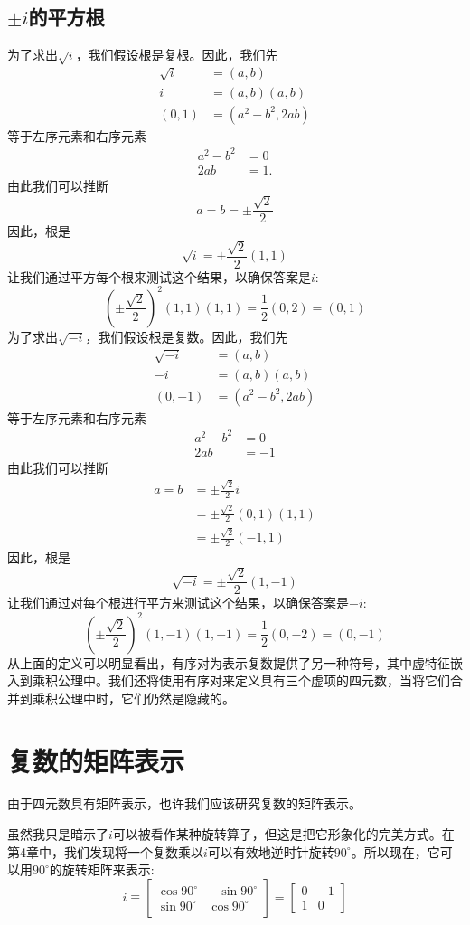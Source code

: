 \subsection{\boldmath $\pm i$的平方根}
为了求出$\sqrt{i}$，我们假设根是复根。因此，我们先
$$
\begin{aligned}
\sqrt{i} & =(a, b) \\
i & =(a, b)(a, b) \\
(0,1) & =\left(a^{2}-b^{2}, 2 a b\right)
\end{aligned}
$$
等于左序元素和右序元素
$$
\begin{aligned}
a^{2}-b^{2} & =0 \\
2 a b & =1 .
\end{aligned}
$$
由此我们可以推断
$$
a=b= \pm \frac{\sqrt{2}}{2}
$$
因此，根是
$$
\sqrt{i}= \pm \frac{\sqrt{2}}{2}(1,1)
$$
让我们通过平方每个根来测试这个结果，以确保答案是$i$:
$$
\left( \pm \frac{\sqrt{2}}{2}\right)^{2}(1,1)(1,1)=\frac{1}{2}(0,2)=(0,1)
$$
为了求出$\sqrt{-i}$，我们假设根是复数。因此，我们先
$$
\begin{aligned}
\sqrt{-i} & =(a, b) \\
-i & =(a, b)(a, b) \\
(0,-1) & =\left(a^{2}-b^{2}, 2 a b\right)
\end{aligned}
$$
等于左序元素和右序元素
$$
\begin{aligned}
a^{2}-b^{2} & =0 \\
2 a b & =-1
\end{aligned}
$$
由此我们可以推断
$$
\begin{aligned}
a=b & = \pm \frac{\sqrt{2}}{2} i \\
& = \pm \frac{\sqrt{2}}{2}(0,1)(1,1) \\
& = \pm \frac{\sqrt{2}}{2}(-1,1)
\end{aligned}
$$
因此，根是
$$
\sqrt{-i}= \pm \frac{\sqrt{2}}{2}(1,-1)
$$
让我们通过对每个根进行平方来测试这个结果，以确保答案是$-i$:
$$
\left( \pm \frac{\sqrt{2}}{2}\right)^{2}(1,-1)(1,-1)=\frac{1}{2}(0,-2)=(0,-1)
$$
从上面的定义可以明显看出，有序对为表示复数提供了另一种符号，其中虚特征嵌入到乘积公理中。我们还将使用有序对来定义具有三个虚项的四元数，当将它们合并到乘积公理中时，它们仍然是隐藏的。

\section{复数的矩阵表示}
由于四元数具有矩阵表示，也许我们应该研究复数的矩阵表示。

虽然我只是暗示了$ i $可以被看作某种旋转算子，但这是把它形象化的完美方式。在第4章中，我们发现将一个复数乘以$i$可以有效地逆时针旋转$90^{\circ}$。所以现在，它可以用$90^{\circ}$的旋转矩阵来表示:
$$
i \equiv\left[\begin{array}{cc}
\cos 90^{\circ} & -\sin 90^{\circ} \\
\sin 90^{\circ} & \cos 90^{\circ}
\end{array}\right]=\left[\begin{array}{cc}
0 & -1 \\
1 & 0
\end{array}\right]
$$

